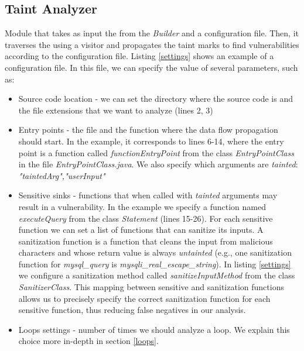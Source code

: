 \subsection{Taint Analyzer} 
Module that takes as input the \astname{} from the \textit{\astname{} Builder} and a configuration file. Then, it traverses the \astname{} using a visitor and propagates the taint marks to find vulnerabilities according to the configuration file. 
Listing \ref{settings} shows an example of a configuration file. In this file, we can specify the value of several parameters, such as:
\begin{itemize}
    \item Source code location - we can set the directory where the source code is and the file extensions that we want to analyze (lines 2, 3)
    \item Entry points - the file and the function where the data flow propagation should start. In the example, it corresponds to lines 6-14, where the entry point is a function called \textit{functionEntryPoint} from the class \textit{EntryPointClass} in the file \textit{EntryPointClass.java}. We also specify which arguments are \textit{tainted}: \textit{"taintedArg","userInput"}
    \item Sensitive sinks - functions that when called with \textit{tainted} arguments may result in a vulnerability. In the example we specify a function named \textit{executeQuery} from the class \textit{Statement} (lines 15-26). For each sensitive function we can set a list of functions that can sanitize its inputs. A sanitization function is a function that cleans the input from malicious characters and whose return value is always \textit{untainted} (e.g., one sanitization function for \textit{mysql\_query} is \textit{mysqli\_real\_escape\_string}). In listing \ref{settings} we configure a sanitization method called \textit{sanitizeInputMethod} from the class \textit{SanitizerClass}. This mapping between sensitive and sanitization functions allows us to precisely specify the correct sanitization function for each sensitive function, thus reducing false negatives in our analysis.
    
    \item Loops settings - number of times we should analyze a loop. We explain this choice more in-depth in section \ref{loops}.
\end{itemize}


